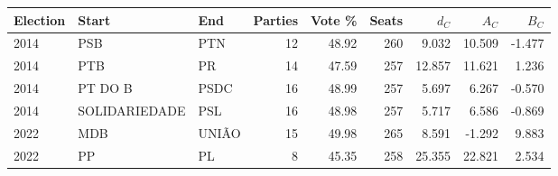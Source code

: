 \begin{tabular}{@{}lllrrrrrr@{}}
\toprule
Election & Start & End & Parties & Vote \% & Seats & \(d_C\) & \(A_C\) & \(B_C\) \\
\midrule
2014 & PSB & PTN & 12 & 48.92 & 260 & 9.032 & 10.509 & -1.477 \\
2014 & PTB & PR & 14 & 47.59 & 257 & 12.857 & 11.621 & 1.236 \\
2014 & PT DO B & PSDC & 16 & 48.99 & 257 & 5.697 & 6.267 & -0.570 \\
2014 & SOLIDARIEDADE & PSL & 16 & 48.98 & 257 & 5.717 & 6.586 & -0.869 \\
2022 & MDB & UNIÃO & 15 & 49.98 & 265 & 8.591 & -1.292 & 9.883 \\
2022 & PP & PL & 8 & 45.35 & 258 & 25.355 & 22.821 & 2.534 \\
\bottomrule
\end{tabular}

